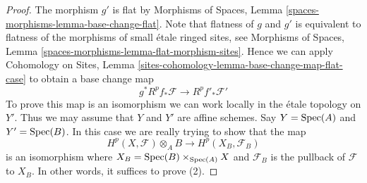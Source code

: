 \begin{proof}
The morphism $g'$ is flat by
Morphisms of Spaces, Lemma \ref{spaces-morphisms-lemma-base-change-flat}.
Note that flatness of $g$ and $g'$ is equivalent to flatness
of the morphisms of small \'etale ringed sites, see
Morphisms of Spaces, Lemma \ref{spaces-morphisms-lemma-flat-morphism-sites}.
Hence we can apply
Cohomology on Sites, Lemma
\ref{sites-cohomology-lemma-base-change-map-flat-case}
to obtain a base change map
$$
g^*R^pf_*\mathcal{F} \longrightarrow R^pf'_*\mathcal{F}'
$$
To prove this map is an isomorphism we can work locally in the \'etale
topology on $Y'$. Thus we may assume that $Y$ and $Y'$ are affine
schemes. Say $Y = \operatorname{Spec}(A)$ and $Y' = \operatorname{Spec}(B)$.
In this case we are really trying to show that the map
$$
H^p(X, \mathcal{F}) \otimes_A B \longrightarrow H^p(X_B, \mathcal{F}_B)
$$
is an isomorphism where $X_B = \operatorname{Spec}(B) \times_{\operatorname{Spec}(A)} X$ and
$\mathcal{F}_B$ is the pullback of $\mathcal{F}$ to $X_B$.
In other words, it suffices to prove (2).


\end{proof}
